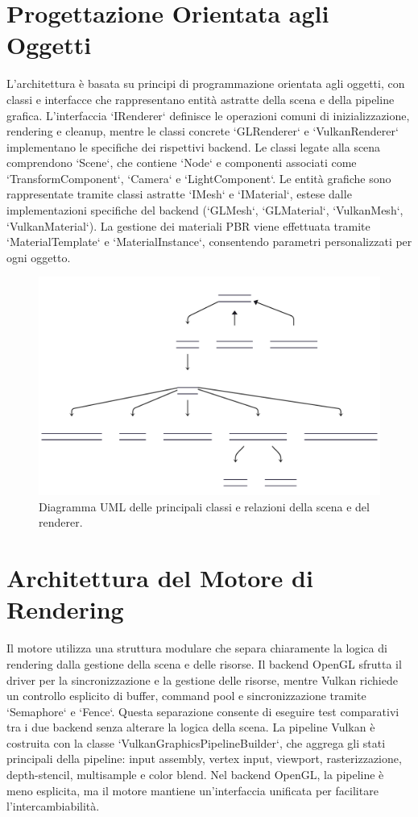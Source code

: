 \documentclass[12pt,a4paper,openright,twoside]{book}
\begin{document}
\section{Progettazione Orientata agli Oggetti}
L'architettura è basata su principi di programmazione orientata agli oggetti, con classi e interfacce che rappresentano
entità astratte della scena e della pipeline grafica. L'interfaccia `IRenderer` definisce le operazioni comuni di
inizializzazione, rendering e cleanup, mentre le classi concrete `GLRenderer` e `VulkanRenderer` implementano le
specifiche dei rispettivi backend.
Le classi legate alla scena comprendono `Scene`, che contiene `Node` e componenti associati come `TransformComponent`,
`Camera` e `LightComponent`. Le entità grafiche sono rappresentate tramite classi astratte `IMesh` e `IMaterial`, estese
dalle implementazioni specifiche del backend (`GLMesh`, `GLMaterial`, `VulkanMesh`, `VulkanMaterial`). La gestione dei
materiali PBR viene effettuata tramite `MaterialTemplate` e `MaterialInstance`, consentendo parametri personalizzati
per ogni oggetto.
\begin{figure}[H!]
    \centering
    \includegraphics[width=.8\linewidth]{figures/uml_scene_renderer.pdf}
    \caption{Diagramma UML delle principali classi e relazioni della scena e del renderer.}
    \label{fig:uml-scene-renderer}
\end{figure}

\section{Architettura del Motore di Rendering}
Il motore utilizza una struttura modulare che separa chiaramente la logica di rendering dalla gestione della scena e
delle risorse. Il backend OpenGL sfrutta il driver per la sincronizzazione e la gestione delle risorse, mentre Vulkan
richiede un controllo esplicito di buffer, command pool e sincronizzazione tramite `Semaphore` e `Fence`. Questa
separazione consente di eseguire test comparativi tra i due backend senza alterare la logica della scena.
La pipeline Vulkan è costruita con la classe `VulkanGraphicsPipelineBuilder`, che aggrega gli stati principali della
pipeline: input assembly, vertex input, viewport, rasterizzazione, depth-stencil, multisample e color blend. Nel backend
OpenGL, la pipeline è meno esplicita, ma il motore mantiene un'interfaccia unificata per facilitare l'intercambiabilità.
\end{document}
